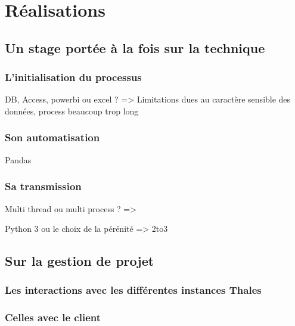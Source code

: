 \chapter{Réalisations}




\section{Un stage portée à la fois sur la technique}

\subsection{L'initialisation du processus}

DB, Access, powerbi ou excel ?
=> Limitations dues au caractère sensible des données, process beaucoup trop long

\subsection{Son automatisation}
Pandas

\subsection{Sa transmission}
Multi thread ou multi process ?
=> 

Python 3 ou le choix de la pérénité
=> 2to3

\section{Sur la gestion de projet}

\subsection{Les interactions avec les différentes instances Thales}

\subsection{Celles avec le client}